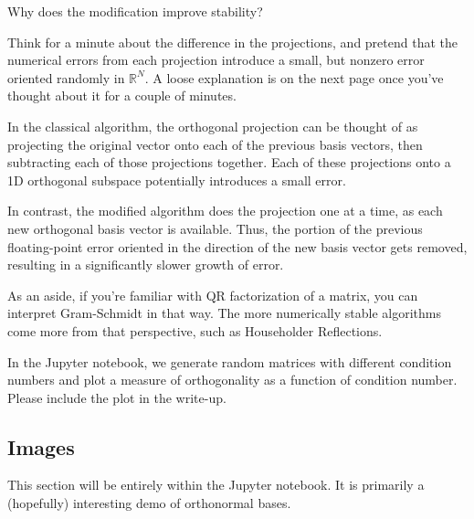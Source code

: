 \documentclass[12pt]{article}
\newcommand{\0}{\mathbf{0}}
\newcommand{\1}{\mathbf{1}}
\begin{document}
Why does the modification improve stability?

Think for a minute about the difference in the projections, and pretend that the numerical errors from each projection introduce a small, but nonzero error oriented randomly in $\mathbb{R}^N$.
A loose explanation is on the next page once you've thought about it for a couple of minutes.
\pagebreak

In the classical algorithm, the orthogonal projection can be thought of as projecting the original vector onto each of the previous basis vectors, then subtracting each of those projections together.
Each of these projections onto a 1D orthogonal subspace potentially introduces a small error.

In contrast, the modified algorithm does the projection one at a time, as each new orthogonal basis vector is available.
Thus, the portion of the previous floating-point error oriented in the direction of the new basis vector gets removed, resulting in a significantly slower growth of error.

As an aside, if you're familiar with QR factorization of a matrix, you can interpret Gram-Schmidt in that way.
The more numerically stable algorithms come more from that perspective, such as Householder Reflections.

In the Jupyter notebook, we generate random matrices with different condition numbers and plot a measure of orthogonality as a function of condition number.
Please include the plot in the write-up. 

\subsection*{Images}
This section will be entirely within the Jupyter notebook.
It is primarily a (hopefully) interesting demo of orthonormal bases.



\end{document}
